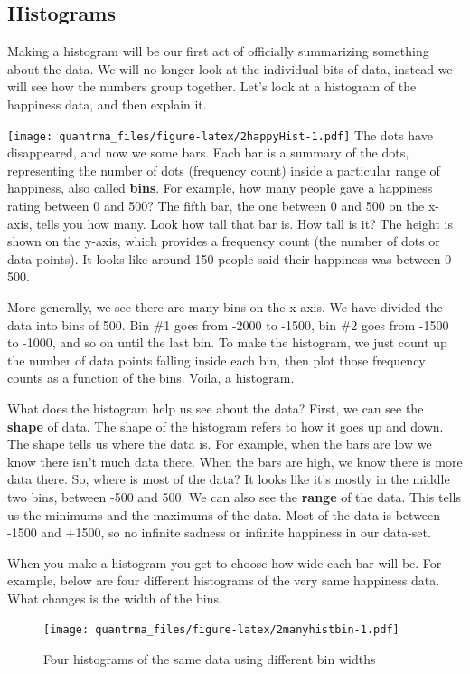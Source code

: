 \documentclass[
]{book}
\begin{document}
\hypertarget{histograms}{%
\subsection{Histograms}\label{histograms}}

Making a histogram will be our first act of officially summarizing something about the data. We will no longer look at the individual bits of data, instead we will see how the numbers group together. Let's look at a histogram of the happiness data, and then explain it.

\texttt{[image: quantrma\_files/figure-latex/2happyHist-1.pdf]}
The dots have disappeared, and now we some bars. Each bar is a summary of the dots, representing the number of dots (frequency count) inside a particular range of happiness, also called \textbf{bins}. For example, how many people gave a happiness rating between 0 and 500? The fifth bar, the one between 0 and 500 on the x-axis, tells you how many. Look how tall that bar is. How tall is it? The height is shown on the y-axis, which provides a frequency count (the number of dots or data points). It looks like around 150 people said their happiness was between 0-500.

More generally, we see there are many bins on the x-axis. We have divided the data into bins of 500. Bin \#1 goes from -2000 to -1500, bin \#2 goes from -1500 to -1000, and so on until the last bin. To make the histogram, we just count up the number of data points falling inside each bin, then plot those frequency counts as a function of the bins. Voila, a histogram.

What does the histogram help us see about the data? First, we can see the \textbf{shape} of data. The shape of the histogram refers to how it goes up and down. The shape tells us where the data is. For example, when the bars are low we know there isn't much data there. When the bars are high, we know there is more data there. So, where is most of the data? It looks like it's mostly in the middle two bins, between -500 and 500. We can also see the \textbf{range} of the data. This tells us the minimums and the maximums of the data. Most of the data is between -1500 and +1500, so no infinite sadness or infinite happiness in our data-set.

When you make a histogram you get to choose how wide each bar will be. For example, below are four different histograms of the very same happiness data. What changes is the width of the bins.

\begin{figure}
\centering
\texttt{[image: quantrma\_files/figure-latex/2manyhistbin-1.pdf]}
\caption{\label{fig:2manyhistbin}Four histograms of the same data using different bin widths}
\end{figure}
\end{document}
